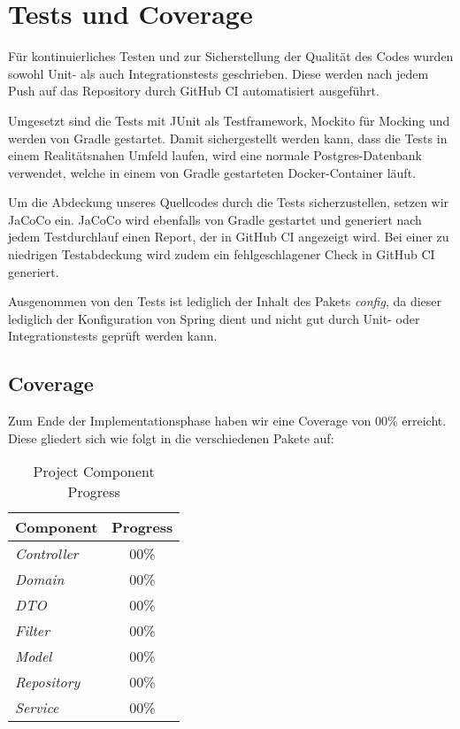 
\chapter{Tests und Coverage}
\label{ch:tests}

Für kontinuierliches Testen und zur Sicherstellung der Qualität des Codes wurden sowohl Unit- als auch Integrationstests geschrieben.
Diese werden nach jedem Push auf das Repository durch GitHub CI automatisiert ausgeführt.

Umgesetzt sind die Tests mit JUnit als Testframework, Mockito für Mocking und werden von Gradle gestartet.
Damit sichergestellt werden kann, dass die Tests in einem Realitätsnahen Umfeld laufen,
wird eine normale Postgres-Datenbank verwendet, welche in einem von Gradle gestarteten Docker-Container läuft.

Um die Abdeckung unseres Quellcodes durch die Tests sicherzustellen, setzen wir JaCoCo ein.
JaCoCo wird ebenfalls von Gradle gestartet und generiert nach jedem Testdurchlauf einen Report, der in GitHub CI angezeigt wird.
Bei einer zu niedrigen Testabdeckung wird zudem ein fehlgeschlagener Check in GitHub CI generiert.

Ausgenommen von den Tests ist lediglich der Inhalt des Pakets \textit{config},
da dieser lediglich der Konfiguration von Spring dient und nicht gut durch Unit- oder Integrationstests geprüft werden kann.

\newpage

\section{Coverage}\label{sec:coverage}

Zum Ende der Implementationsphase haben wir eine Coverage von 00\% erreicht.
Diese gliedert sich wie folgt in die verschiedenen Pakete auf:

\begin{table}[h]
    \centering
    \renewcommand{\arraystretch}{1.3}
    \begin{tabular}{|l|c|}
        \hline
        \textbf{Component} & \textbf{Progress} \\
        \hline
        \textit{Controller}  & 00\% \\
        \textit{Domain}      & 00\% \\
        \textit{DTO}         & 00\% \\
        \textit{Filter}      & 00\% \\
        \textit{Model}       & 00\% \\
        \textit{Repository}  & 00\% \\
        \textit{Service}     & 00\% \\
        \hline
    \end{tabular}
    \caption{Project Component Progress}
    \label{tab:progress}
\end{table}
